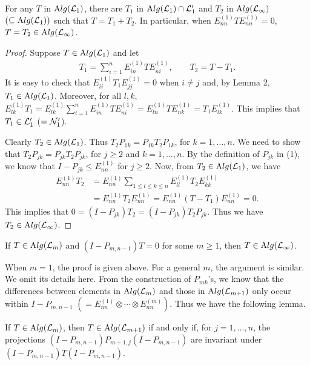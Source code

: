 \begin{lemma} For any $T$ in
$\mathrm Alg(\mathcal L_1)$, there are $T_1$ in $\mathrm Alg(\mathcal L_1)\cap \mathcal L_1'$ and $T_2$
in $\mathrm Alg(\mathcal L_\infty)$ $(\subseteq \mathrm Alg(\mathcal L_1))$ such that
$T=T_1+T_2$. In particular, when $E_{nn}^{(1)}TE_{nn}^{(1)}=0$,
$T=T_2\in\mathrm Alg(\mathcal L_\infty)$.
\end{lemma}

\begin{proof}
Suppose $T\in\mathrm Alg(\mathcal L_1)$ and let
\begin{align}
T_1=\sum_{i=1}^n E_{in}^{(1)}T E_{ni}^{(1)},\qquad T_2=T-T_1.
\end{align}
It is easy to check that $E_{ii}^{(1)}T_1 E_{jj}^{(1)}=0$ when
$i\neq j$ and, by Lemma 2, $T_1\in\mathrm Alg(\mathcal L_1)$. Moreover, for all
$l,k$, $ E_{lk}^{(1)}T_1=E_{lk}^{(1)}\sum_{i=1}^nE_{in}^{(1)}T
E_{ni}^{(1)} =E_{ln}^{(1)}T E_{nk}^{(1)}=T_1E_{lk}^{(1)}$. This
implies that $T_1\in\mathcal L_1'$ ($=\mathcal N_1'$).

Clearly $T_2\in\mathrm Alg(\mathcal L_1)$. Thus $T_2P_{1k}=P_{1k}T_2P_{1k}$, for
$k=1,\ldots, n$. We need to show that $T_2P_{jk}=P_{jk}T_2P_{jk}$,
for $j\geq 2$ and $k=1,\ldots, n$. By the definition of $P_{jk}$ in
(1), we know that $I-P_{jk}\leq E_{nn}^{(1)}$ for $j\geq 2$.  Now,
from $T_2\in\mathrm Alg(\mathcal L_1)$, we have
\begin{align*}
E_{nn}^{(1)}T_2&=E_{nn}^{(1)}\sum_{1\le l\le k\le n} E_{ll}^{(1)}
T_2 E_{kk}^{(1)}\\
&=E_{nn}^{(1)}T_2E_{nn}^{(1)}
=E_{nn}^{(1)}(T-T_1)E_{nn}^{(1)}=0.
\end{align*}
This implies that $0=(I-P_{jk})T_2=(I-P_{jk})T_2P_{jk}$. Thus we
have $T_2\in\mathrm Alg(\mathcal L_\infty)$.
\end{proof}

\begin{lemma}
If $T\in\mathrm Alg(\mathcal L_m)$ and
$(I-P_{m,n-1})T=0$ for some $m\geq1$, then $T\in\mathrm Alg(\mathcal L_\infty)$.
\end{lemma}

When $m=1$, the proof is given above. For a general $m$, the
argument is similar. We omit its details here. From the
construction of $P_{mk}$'s, we know that the differences between
elements in $\mathrm Alg(\mathcal L_m)$ and those in $\mathrm Alg(\mathcal L_{m+1})$ only occur
within $I-P_{m,n-1}$ $(=E_{nn}^{(1)}\otimes\cdots\otimes
E_{nn}^{(m)})$. Thus we have the following lemma.

\begin{lemma}
If $T\in\mathrm Alg(\mathcal L_m)$, then
$T\in\mathrm Alg(\mathcal L_{m+1})$ if and only if, for $j=1,\ldots,n$, the
projections $(I-P_{m,n-1})P_{m+1,j}(I-P_{m,n-1})$ are invariant
under $(I-P_{m,n-1})T(I-P_{m,n-1})$.
\end{lemma}

